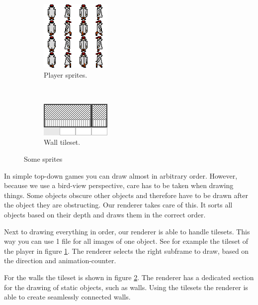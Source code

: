 \documentclass[a4paper,pdf,12pt]{article}
\begin{document}
\begin{figure}
        \centering
        \begin{subfigure}[b]{0.4\textwidth}
                \centering
                \includegraphics{../img/player.png}
                \caption{Player sprites.}
                \label{fig:player}
        \end{subfigure}%
        ~ %
        \begin{subfigure}[b]{0.4\textwidth}
                \centering
                \includegraphics{../img/ground_test.png}
                \caption{Wall tileset.}
                \label{fig:walls}
        \end{subfigure}
        \caption{Some sprites}\label{fig:sprites}
\end{figure}

In simple top-down games you can draw almost in arbitrary order. However, because we use a bird-view perspective, care has to be taken when drawing things. Some objects obscure other objects and therefore have to be drawn after the object they are obstructing. Our renderer takes care of this. It sorts all objects based on their depth and draws them in the correct order.

Next to drawing everything in order, our renderer is able to handle tilesets. This way you can use 1 file for all images of one object. See for example the tileset of the player in figure \ref{fig:player}. The renderer selects the right subframe to draw, based on the direction and animation-counter.

For the walls the tileset is shown in figure \ref{fig:walls}. The renderer has a dedicated section for the drawing of static objects, such as walls. Using the tilesets the renderer is able to create seamlessly connected walls.


\end{document}
